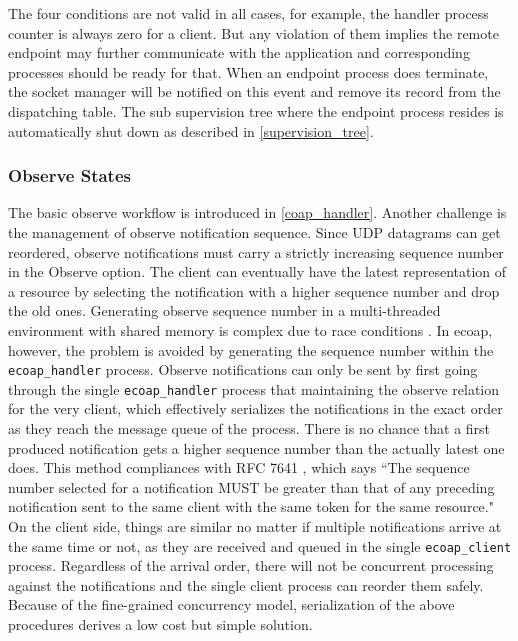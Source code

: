 The four conditions are not valid in all cases, for example, the handler process counter is always zero for a client. But any violation of them implies the remote endpoint may further communicate with the application and corresponding processes should be ready for that. When an endpoint process does terminate, the socket manager will be notified on this event and remove its record from the dispatching table. The sub supervision tree where the endpoint process resides is automatically shut down as described in \autoref{supervision_tree}. 

\subsubsection{Observe States}

The basic observe workflow is introduced in \autoref{coap_handler}. Another challenge is the management of observe notification sequence. Since UDP datagrams can get reordered, observe notifications must carry a strictly increasing sequence number in the Observe option. The client can eventually have the latest representation of a resource by selecting the notification with a higher sequence number and drop the old ones. Generating observe sequence number in a multi-threaded environment with shared memory is complex due to race conditions \autocite{kovatsch2015scalable}. In ecoap, however, the problem is avoided by generating the sequence number within the \verb|ecoap_handler| process. Observe notifications can only be sent by first going through the single \verb|ecoap_handler| process that maintaining the observe relation for the very client, which effectively serializes the notifications in the exact order as they reach the message queue of the process. There is no chance that a first produced notification gets a higher sequence number than the actually latest one does. This method compliances with RFC 7641 \autocite{coap_observe}, which says ``The sequence number selected for a notification MUST be greater than that of any preceding notification sent to the same client with the same token for the same resource." On the client side, things are similar no matter if multiple notifications arrive at the same time or not, as they are received and queued in the single \verb|ecoap_client| process. Regardless of the arrival order, there will not be concurrent processing against the notifications and the single client process can reorder them safely. Because of the fine-grained concurrency model, serialization of the above procedures derives a low cost but simple solution. 

